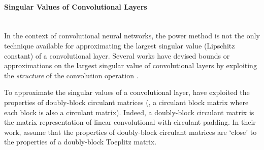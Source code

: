 

\paragraph{Singular Values of Convolutional Layers} ~\\

\noindent
In the context of convolutional neural networks, the power method is not the only technique available for approximating the largest singular value (Lipschitz constant) of a convolutional layer.
Several works have devised bounds or approximations on the largest singular value of convolutional layers by exploiting the \emph{structure} of the convolution operation \cite{sedghi2018singular,bibi2019deep,singla2019bounding}.

%


To approximate the singular values of a convolutional layer, \citet{sedghi2018singular} have exploited the properties of doubly-block circulant matrices (\ie, a circulant block matrix where each block is also a circulant matrix).
Indeed, a doubly-block circulant matrix is the matrix representation of linear convolutional with circulant padding.
In their work, \citet{sedghi2018singular} assume that the properties of doubly-block circulant matrices are `close' to the properties of a doubly-block Toeplitz matrix.

